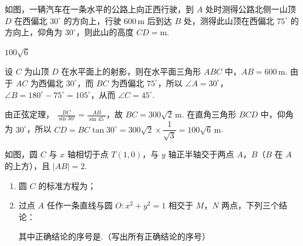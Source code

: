 \begin{problem}
如图，一辆汽车在一条水平的公路上向正西行驶，到 \(A\) 处时测得公路北侧一山顶 \(D\) 在西偏北 \(30^\circ\) 的方向上，行驶 \(600\,\mathrm{m}\) 后到达 \(B\) 处，测得此山顶在西偏北 \(75^\circ\) 的方向上，仰角为 \(30^\circ\)，则此山的高度 \(CD=\)\fillinblank{}\(\mathrm{m}\).

\end{problem}

\begin{answer}
\(100\sqrt{6}\)
\end{answer}

\begin{solution}
设 \(C\) 为山顶 \(D\) 在水平面上的射影，则在水平面三角形 \(ABC\) 中，\(AB=600\,\mathrm m\). 由于 \(AC\) 为西偏北 \(30^\circ\)，而 \(BC\) 为西偏北 \(75^\circ\)，所以 \(\angle A=30^\circ\)，\(\angle B=180^\circ-75^\circ=105^\circ\)，从而 \(\angle C=45^\circ\).

由正弦定理，
\(\displaystyle\frac{BC}{\sin30^\circ}=\frac{AB}{\sin45^\circ}\)，故 \(BC=300\sqrt2\,\mathrm m\). 在直角三角形 \(BCD\) 中，仰角为 \(30^\circ\)，所以
\(CD=BC\tan30^\circ=300\sqrt2\times\dfrac1{\sqrt3}=100\sqrt6\,\mathrm m\).
\end{solution}

\begin{problem}
如图，圆 \(C\) 与 \(x\) 轴相切于点 \(T(1,0)\)，与 \(y\) 轴正半轴交于两点 \(A\)，\(B\)（\(B\) 在 \(A\) 的上方），且 \(|AB|=2\).

\begin{enumerate}
\item 圆 \(C\) 的标准方程为\fillinblank{}；
\item 过点 \(A\) 任作一条直线与圆 \(O\colon x^2+y^2=1\) 相交于 \(M\)，\(N\) 两点，下列三个结论：
其中正确结论的序号是\fillinblank{}.（写出所有正确结论的序号）
\end{enumerate}

\end{problem}

